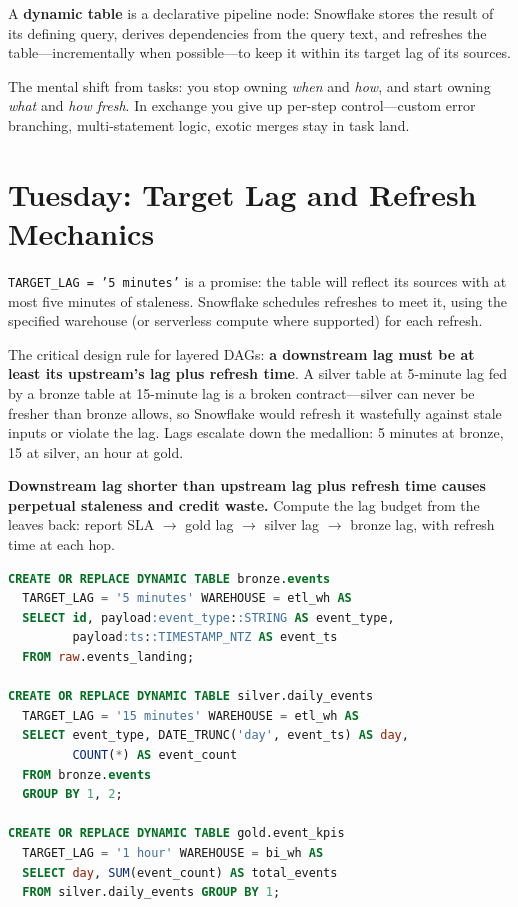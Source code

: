 \begin{definitionbox}
A \textbf{dynamic table} is a declarative pipeline node: Snowflake stores the result of its defining query, derives dependencies from the query text, and refreshes the table---incrementally when possible---to keep it within its target lag of its sources.
\end{definitionbox}

The mental shift from tasks: you stop owning \emph{when} and \emph{how}, and start owning \emph{what} and \emph{how fresh}. In exchange you give up per-step control---custom error branching, multi-statement logic, exotic merges stay in task land.

\section{Tuesday: Target Lag and Refresh Mechanics}
\texttt{TARGET\_LAG = '5 minutes'} is a promise: the table will reflect its sources with at most five minutes of staleness. Snowflake schedules refreshes to meet it, using the specified warehouse (or serverless compute where supported) for each refresh.

The critical design rule for layered DAGs: \textbf{a downstream lag must be at least its upstream's lag plus refresh time}. A silver table at 5-minute lag fed by a bronze table at 15-minute lag is a broken contract---silver can never be fresher than bronze allows, so Snowflake would refresh it wastefully against stale inputs or violate the lag. Lags escalate down the medallion: 5 minutes at bronze, 15 at silver, an hour at gold.

\begin{pitfall}
\textbf{Downstream lag shorter than upstream lag plus refresh time causes perpetual staleness and credit waste.} Compute the lag budget from the leaves back: report SLA $\rightarrow$ gold lag $\rightarrow$ silver lag $\rightarrow$ bronze lag, with refresh time at each hop.
\end{pitfall}

\begin{lstlisting}[language=SQL, caption={Dynamic tables in a Bronze--Silver--Gold chain}]
CREATE OR REPLACE DYNAMIC TABLE bronze.events
  TARGET_LAG = '5 minutes' WAREHOUSE = etl_wh AS
  SELECT id, payload:event_type::STRING AS event_type,
         payload:ts::TIMESTAMP_NTZ AS event_ts
  FROM raw.events_landing;

CREATE OR REPLACE DYNAMIC TABLE silver.daily_events
  TARGET_LAG = '15 minutes' WAREHOUSE = etl_wh AS
  SELECT event_type, DATE_TRUNC('day', event_ts) AS day,
         COUNT(*) AS event_count
  FROM bronze.events
  GROUP BY 1, 2;

CREATE OR REPLACE DYNAMIC TABLE gold.event_kpis
  TARGET_LAG = '1 hour' WAREHOUSE = bi_wh AS
  SELECT day, SUM(event_count) AS total_events
  FROM silver.daily_events GROUP BY 1;
\end{lstlisting}

